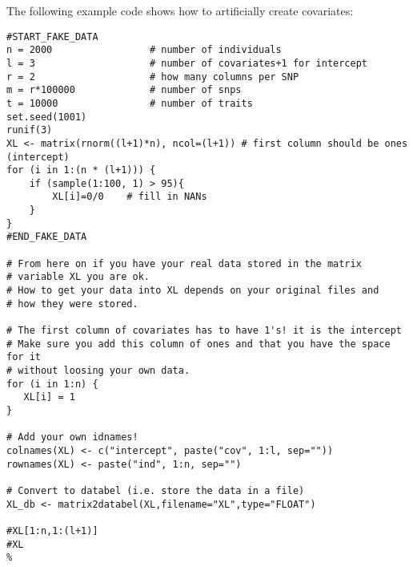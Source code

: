 The following example code shows how to artificially create covariates:
\begin{lstlisting}[escapechar=\%]
#START_FAKE_DATA
n = 2000                 # number of individuals
l = 3                    # number of covariates+1 for intercept
r = 2                    # how many columns per SNP
m = r*100000             # number of snps
t = 10000                # number of traits
set.seed(1001)
runif(3)
XL <- matrix(rnorm((l+1)*n), ncol=(l+1)) # first column should be ones (intercept)
for (i in 1:(n * (l+1))) {
    if (sample(1:100, 1) > 95){
        XL[i]=0/0    # fill in NANs
    }
}
#END_FAKE_DATA

# From here on if you have your real data stored in the matrix
# variable XL you are ok.
# How to get your data into XL depends on your original files and
# how they were stored.

# The first column of covariates has to have 1's! it is the intercept
# Make sure you add this column of ones and that you have the space for it
# without loosing your own data.
for (i in 1:n) {
   XL[i] = 1
}

# Add your own idnames!
colnames(XL) <- c("intercept", paste("cov", 1:l, sep=""))
rownames(XL) <- paste("ind", 1:n, sep="")

# Convert to databel (i.e. store the data in a file)
XL_db <- matrix2databel(XL,filename="XL",type="FLOAT")

#XL[1:n,1:(l+1)]
#XL
%
\end{lstlisting}

